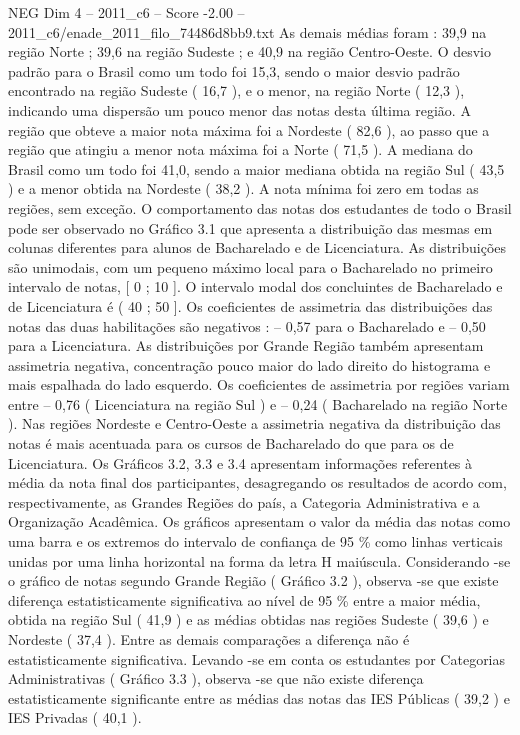 \begin{textsample}{NEG Dim 4 – 2011\_c6 – Score -2.00 – 2011\_c6/enade\_2011\_filo\_74486d8bb9.txt}
As demais médias foram : 39,9 na região Norte ; 39,6 na região Sudeste ; e 40,9 na região Centro-Oeste.
O desvio padrão para o Brasil como um todo foi 15,3, sendo o maior desvio padrão encontrado na região Sudeste ( 16,7 ), e o menor, na região Norte ( 12,3 ), indicando uma dispersão um pouco menor das notas desta última região.
A região que obteve a maior nota máxima foi a Nordeste ( 82,6 ), ao passo que a região que atingiu a menor nota máxima foi a Norte ( 71,5 ).
A mediana do Brasil como um todo foi 41,0, sendo a maior mediana obtida na região Sul ( 43,5 ) e a menor obtida na Nordeste ( 38,2 ).
A nota mínima foi zero em todas as regiões, sem exceção.
O comportamento das notas dos estudantes de todo o Brasil pode ser observado no Gráfico 3.1 que apresenta a distribuição das mesmas em colunas diferentes para alunos de Bacharelado e de Licenciatura.
As distribuições são unimodais, com um pequeno máximo local para o Bacharelado no primeiro intervalo de notas, [ 0 ; 10 ].
O intervalo modal dos concluintes de Bacharelado e de Licenciatura é ( 40 ; 50 ].
Os coeficientes de assimetria das distribuições das notas das duas habilitações são negativos : – 0,57 para o Bacharelado e – 0,50 para a Licenciatura.
As distribuições por Grande Região também apresentam assimetria negativa, concentração pouco maior do lado direito do histograma e mais espalhada do lado esquerdo.
Os coeficientes de assimetria por regiões variam entre – 0,76 ( Licenciatura na região Sul ) e – 0,24 ( Bacharelado na região Norte ).
Nas regiões Nordeste e Centro-Oeste a assimetria negativa da distribuição das notas é mais acentuada para os cursos de Bacharelado do que para os de Licenciatura.
Os Gráficos 3.2, 3.3 e 3.4 apresentam informações referentes à média da nota final dos participantes, desagregando os resultados de acordo com, respectivamente, as Grandes Regiões do país, a Categoria Administrativa e a Organização Acadêmica.
Os gráficos apresentam o valor da média das notas como uma barra e os extremos do intervalo de confiança de 95 \% como linhas verticais unidas por uma linha horizontal na forma da letra H maiúscula.
Considerando -se o gráfico de notas segundo Grande Região ( Gráfico 3.2 ), observa -se que existe diferença estatisticamente significativa ao nível de 95 \% entre a maior média, obtida na região Sul ( 41,9 ) e as médias obtidas nas regiões Sudeste ( 39,6 ) e Nordeste ( 37,4 ).
Entre as demais comparações a diferença não é estatisticamente significativa.
Levando -se em conta os estudantes por Categorias Administrativas ( Gráfico 3.3 ), observa -se que não existe diferença estatisticamente significante entre as médias das notas das IES Públicas ( 39,2 ) e IES Privadas ( 40,1 ).

\end{textsample}
